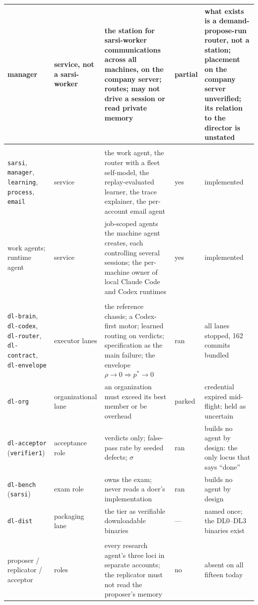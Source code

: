 \documentclass[11pt]{article}
\theoremstyle{definition}
\begin{document}
\begin{table}[!htbp]
\begin{tabularx}{\textwidth}{@{}>{\raggedright\arraybackslash}p{3.6cm}>{\raggedright\arraybackslash}p{1.7cm}Y>{\raggedright\arraybackslash}p{1.2cm}>{\raggedright\arraybackslash}p{2.9cm}@{}}
manager & service, not a sarsi-worker & the station for sarsi-worker communications across all machines, on the company server; routes; may not drive a session or read private memory & partial & what exists is a demand-propose-run router, not a station; placement on the company server unverified; its relation to the director is unstated \\
\midrule
{} \\
\texttt{sarsi}, \texttt{manager}, \texttt{learning}, \texttt{process}, \texttt{email} & service & the work agent, the router with a fleet self-model, the replay-evaluated learner, the trace explainer, the per-account email agent & yes & implemented \\
work agents; runtime agent & service & job-scoped agents the machine agent creates, each controlling several sessions; the per-machine owner of local Claude Code and Codex runtimes & yes & implemented \\
\midrule
{} \\
\texttt{dl-brain}, \texttt{dl-codex}, \texttt{dl-router}, \texttt{dl-contract}, \texttt{dl-envelope} & executor lanes & the reference chassis; a Codex-first motor; learned routing on verdicts; specification as the main failure; the envelope $\rho \to 0 \Rightarrow p^{*} \to 0$ & ran & all lanes stopped, 162 commits bundled \\
\texttt{dl-org} & organizational lane & an organization must exceed its best member or be overhead & parked & credential expired mid-flight; held as uncertain \\
\texttt{dl-acceptor} (\texttt{verifier1}) & acceptance role & verdicts only; false-pass rate by seeded defects; $\sigma$ & ran & builds no agent by design: the only locus that says ``done'' \\
\texttt{dl-bench} (\texttt{sarsi}) & exam role & owns the exam; never reads a doer's implementation & ran & builds no agent by design \\
\texttt{dl-dist} & packaging lane & the tier as verifiable downloadable binaries & --- & named once; the DL0--DL3 binaries exist \\
\midrule
{} \\
proposer / replicator / acceptor & roles & every research agent's three loci in separate accounts; the replicator must not read the proposer's memory & no & absent on all fifteen today \\

\end{tabularx}
\end{table}
\end{document}
